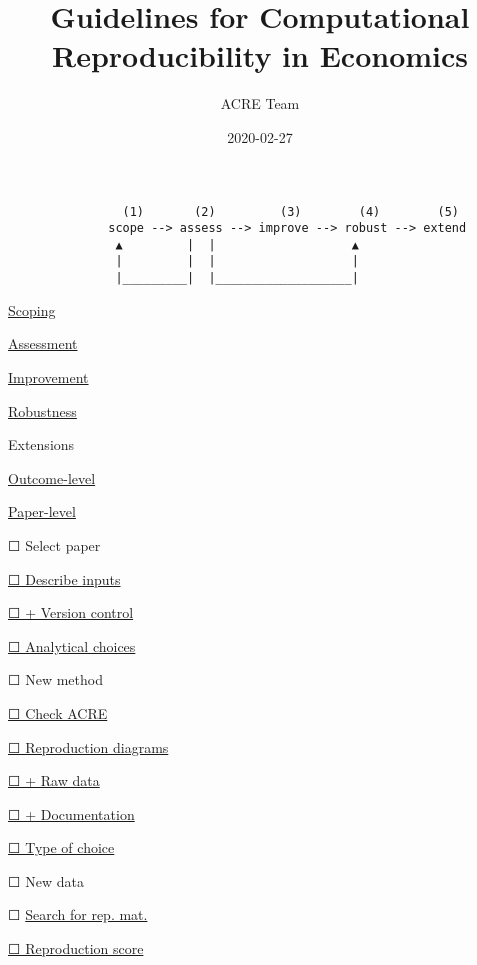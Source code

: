 \documentclass[]{book}
\title{Guidelines for Computational Reproducibility in Economics}
\author{ACRE Team}
\date{2020-02-27}
\begin{document}
\maketitle

{
\setcounter{tocdepth}{1}
\tableofcontents
}
\hypertarget{section}{%
\chapter*{}\label{section}}

\begin{verbatim}
                (1)       (2)         (3)        (4)        (5)
              scope --> assess --> improve --> robust --> extend
               ▲         |  |                   ▲
               |         |  |                   |
               |_________|  |___________________|
\end{verbatim}

\protect\hyperlink{scoping}{Scoping}

\protect\hyperlink{assessment}{Assessment}

\protect\hyperlink{improvements}{Improvement}

\protect\hyperlink{robust}{Robustness}

Extensions

\protect\hyperlink{improvements}{Outcome-level}

\protect\hyperlink{paper-level}{Paper-level}

☐ Select paper

\protect\hyperlink{describe-inputs}{☐ Describe inputs}

\protect\hyperlink{paper-level}{☐ + Version control}

\protect\hyperlink{id-analy}{☐ Analytical choices}

☐ New method

\protect\hyperlink{check-acre}{☐ Check ACRE}

\protect\hyperlink{diagram}{☐ Reproduction diagrams}

\protect\hyperlink{rd}{☐ + Raw data}

\protect\hyperlink{paper-level}{☐ + Documentation}

\protect\hyperlink{id-type}{☐ Type of choice}

☐ New data

☐ \protect\hyperlink{verify-rep-mat}{Search for rep. mat.}

\protect\hyperlink{score}{☐ Reproduction score}
\end{document}
